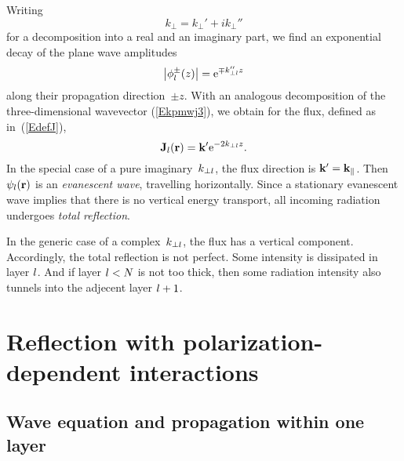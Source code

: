 Writing
\begin{equation}
  k_\perp = k_\perp' + i k_\perp''
\end{equation}
for a decomposition into a real and an imaginary part,
we find an exponential decay of the plane wave amplitudes
\begin{equation}\label{Ephidamp}
  \left|\phi^\pm_l(z)\right|
  = \text{e}^{\mp k_{\perp l}'' z}
\end{equation}
along their propagation direction~$\pm z$.
With an analogous decomposition
of the three-dimensional wavevector (\ref{Ekpmwj3}),
we obtain for the flux, defined as in~(\ref{EdefJ}),
\begin{equation}
  \mathbf{J}_l(\mathbf{r}) = \mathbf{k}' \text{e}^{-2k_{\perp l}z}.
\end{equation}
In the special case of a pure imaginary~$k_{\perp l}$,
the flux direction is $\mathbf{k}'=\mathbf{k}_\parallel$.
Then $\psi_l(\mathbf{r})$ is an \textit{evanescent wave},
%
travelling horizontally.
Since a stationary evanescent wave implies that there is
no vertical energy transport,
all incoming radiation undergoes \textit{total reflection}.
%

In the generic case of a complex~$k_{\perp l}$,
the flux has a vertical component.
Accordingly, the total reflection is not perfect.
Some intensity is dissipated in layer $l$.
%
And if layer $l<N$ is not too thick,
then some radiation intensity also tunnels into the adjecent layer $l+1$.
%


\section{Reflection with polarization-dependent interactions}\label{s:pol}

\iffalse


\subsection{Wave equation and propagation within one layer}

